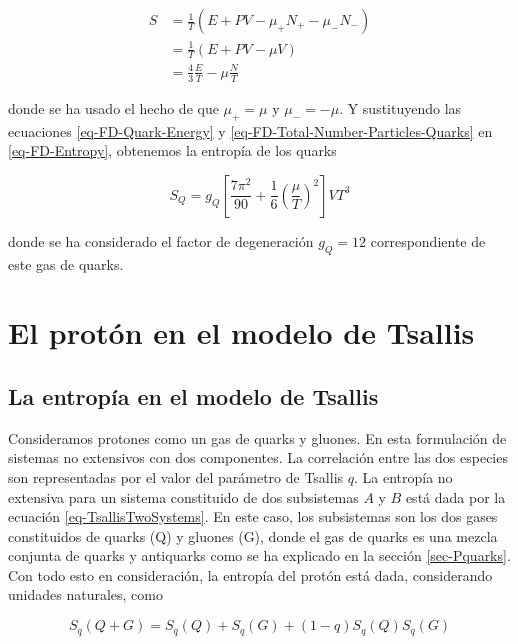 \begin{equation}\label{eq-FD-Entropy}
\begin{split}
S & = \frac{1}{T} \left(E + PV - {\mu}_{+} {N}_{+} - {\mu}_{-} {N}_{-} \right)\\
& = \frac{1}{T} \left(E + PV - \mu V \right) \\
& = \frac{4}{3} \frac{E}{T} - \mu \frac{N}{T}
\end{split}
\end{equation}

donde se ha usado el hecho de que ${\mu}_{+} = \mu$ y ${\mu}_{-} = - \mu$. Y sustituyendo las ecuaciones \eqref{eq-FD-Quark-Energy} y \eqref{eq-FD-Total-Number-Particles-Quarks} en \eqref{eq-FD-Entropy}, obtenemos la entropía de los quarks

\begin{equation}\label{eq-FD-Quark-Entropy}
{S}_{Q} = {g}_{Q} \left[\frac{7{\pi}^{2}}{90} + \frac{1}{6} \left(\frac{\mu}{T} \right)^{2} \right]V{T}^{3}
\end{equation}

donde se ha considerado el factor de degeneración ${g}_{Q} = 12$ correspondiente de este gas de quarks.

\section{El protón en el modelo de Tsallis}

\subsection{La entropía en el modelo de Tsallis}

Consideramos protones como un gas de quarks y gluones. En esta formulación de sistemas no extensivos con dos componentes. La correlación entre las dos especies son representadas por el valor del parámetro de Tsallis $q$. La entropía no extensiva para un sistema constituido de dos subsistemas $A$ y $B$ está dada por la ecuación \eqref{eq-TsallisTwoSystems}. En este caso, los subsistemas son los dos gases constituidos de quarks (Q) y gluones (G), donde el gas de quarks es una mezcla conjunta de quarks y antiquarks como se ha explicado en la sección \ref{sec-Pquarks}. Con todo esto en consideración, la entropía del protón está dada, considerando unidades naturales, como

\begin{equation}
{S}_{q}(Q+G) = {S}_{q}(Q) + {S}_{q}(G) + (1-q){S}_{q}(Q){S}_{q}(G)
\end{equation}

